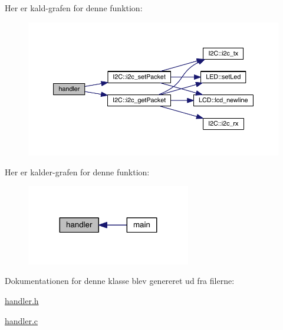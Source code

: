 Her er kald-\/grafen for denne funktion\+:
\nopagebreak
\begin{figure}[H]
\begin{center}
\leavevmode
\includegraphics[width=350pt]{class_handler_af5be5b016b862943cd22504490acc8f4_cgraph}
\end{center}
\end{figure}




Her er kalder-\/grafen for denne funktion\+:\nopagebreak
\begin{figure}[H]
\begin{center}
\leavevmode
\includegraphics[width=203pt]{class_handler_af5be5b016b862943cd22504490acc8f4_icgraph}
\end{center}
\end{figure}




Dokumentationen for denne klasse blev genereret ud fra filerne\+:\begin{DoxyCompactItemize}
\item 
\hyperlink{handler_8h}{handler.\+h}\item 
\hyperlink{handler_8c}{handler.\+c}\end{DoxyCompactItemize}
